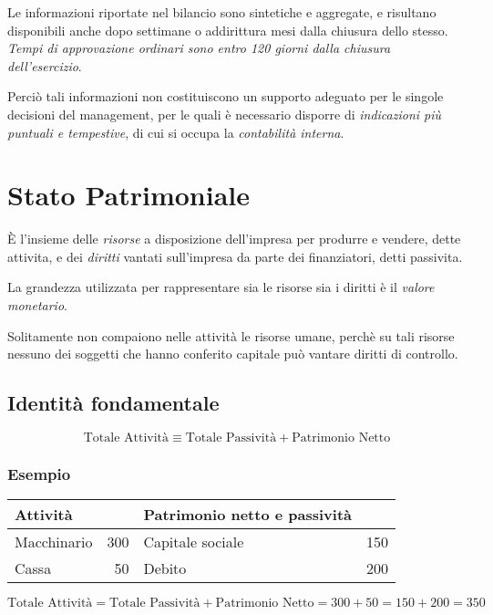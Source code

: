 Le informazioni riportate nel bilancio sono sintetiche e aggregate, e risultano
disponibili anche dopo settimane o  addirittura mesi dalla chiusura dello stesso.
\emph{Tempi di approvazione ordinari sono entro 120 giorni dalla chiusura dell’esercizio}.

Perciò tali informazioni non costituiscono un supporto adeguato per le singole decisioni del management,
per le quali è necessario disporre di \emph{indicazioni più puntuali e tempestive}, di cui si occupa la
\emph{contabilità interna}.

\section{Stato Patrimoniale}
È l'insieme delle \emph{risorse} a disposizione dell’impresa per produrre e vendere, dette \gls{attivita},
e dei \emph{diritti} vantati sull’impresa da parte dei finanziatori, detti \gls{passivita}.

La grandezza utilizzata per rappresentare sia le risorse sia i diritti è il \emph{valore monetario}.

Solitamente non compaiono nelle attività le risorse umane, perchè su tali risorse
nessuno dei soggetti che hanno conferito capitale può vantare diritti di controllo.

\subsection{Identità fondamentale}
\begin{equation*}
    \text{Totale Attività} \equiv \text{Totale Passività} + \text{Patrimonio Netto}
\end{equation*}

\subsubsection{Esempio}
\begin{tabular}{| l r | l r |}
    \hline
    \textbf{Attività} & & \textbf{Patrimonio netto e passività} & \\
    \hline
    Macchinario & 300 & Capitale sociale & 150 \\
    Cassa       & 50  & Debito           & 200 \\ 
    \hline 
\end{tabular}
\newline
\newline
$\text{Totale Attività} = \text{Totale Passività} + \text{Patrimonio Netto} = 300 + 50 = 150 + 200 = 350$

